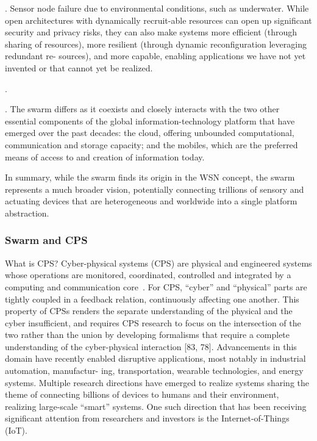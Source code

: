 . Sensor node failure due to environmental conditions, such as
underwater. While open architectures with dynamically recruit-able resources can
open up significant security and privacy risks, they can also make systems more
efficient (through sharing of resources), more resilient (through dynamic
reconfiguration leveraging redundant re- sources), and more capable, enabling
applications we have not yet invented or that cannot yet be realized.

.

. The swarm differs as it coexists and closely interacts with
the two other essential components of the global information-technology platform
that have emerged over the past decades: the cloud, offering unbounded
computational, communication and storage capacity; and the mobiles, which are
the preferred means of access to and creation of information today.

In summary, while the swarm finds its origin in the WSN concept, the swarm
represents a much broader vision, potentially connecting trillions of sensory
and actuating devices that are heterogeneous and worldwide into a single
platform abstraction.

\subsubsection{Swarm and CPS}
\label{sec:swarm-cps}

What is CPS? Cyber-physical systems (CPS) are physical and engineered systems
whose operations are monitored, coordinated, controlled and integrated by a
computing and communication core~\cite{rajkumar2010cyber}. For CPS, ``cyber''
and ``physical'' parts are tightly coupled in a feedback relation, continuously
affecting one another. This property of CPSs renders the separate understanding
of the physical and the cyber insufficient, and requires CPS research to focus
on the intersection of the two rather than the union by developing formalisms
that require a complete understanding of the cyber-physical interaction [83,
78]. Advancements in this domain have recently enabled disruptive applications,
most notably in industrial automation, manufactur- ing, transportation, wearable
technologies, and energy systems. Multiple research directions have emerged to
realize systems sharing the theme of connecting billions of devices to humans
and their environment, realizing large-scale ``smart'' systems. One such
direction that has been receiving significant attention from researchers and
investors is the Internet-of-Things (IoT).

